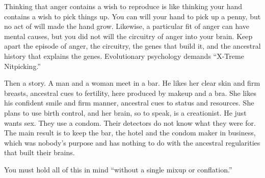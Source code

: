 Thinking that anger contains a wish to reproduce is like thinking your hand contains a wish to pick things up. You can will your hand to pick up a penny, but no act of will made the hand grow. Likewise, a particular fit of anger can have mental causes, but you did not will the circuitry of anger into your brain. Keep apart the episode of anger, the circuitry, the genes that build it, and the ancestral history that explains the genes. Evolutionary psychology demands ``X-Treme Nitpicking.''

Then a story. A man and a woman meet in a bar. He likes her clear skin and firm breasts, ancestral cues to fertility, here produced by makeup and a bra. She likes his confident smile and firm manner, ancestral cues to status and resources. She plans to use birth control, and her brain, so to speak, is a creationist. He just wants sex. They use a condom. Their detectors do not know what they were for. The main result is to keep the bar, the hotel and the condom maker in business, which was nobody's purpose and has nothing to do with the ancestral regularities that built their brains.

You must hold all of this in mind ``without a single mixup or conflation.''

